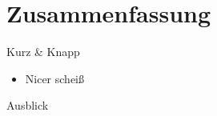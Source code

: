\section{Zusammenfassung}

\begin{frame}{Kurz \& Knapp}    
    \begin{itemize}
        \item Nicer scheiß
    \end{itemize}
\end{frame}

\begin{frame}{Ausblick}   

\end{frame}